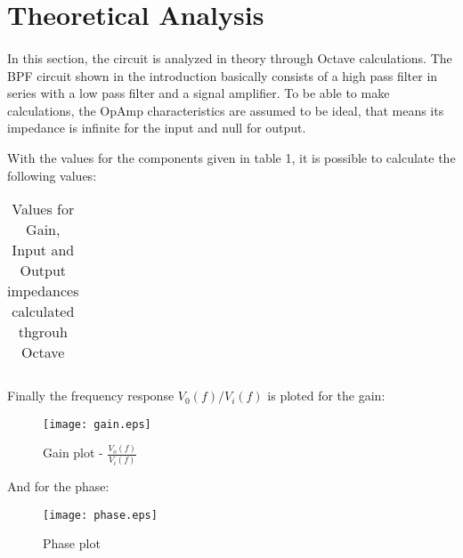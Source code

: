 \section{Theoretical Analysis}
\label{sec:analysis}
\paragraph{}

\par In this section, the circuit is analyzed in theory through Octave calculations. The BPF circuit shown in the introduction basically consists of a high pass filter in series with a low pass filter and a signal amplifier. To be able to make calculations, the OpAmp characteristics are assumed to be ideal, that means its impedance is infinite for the input and null for output.
\par With the values for the components given in table 1, it is possible to calculate the following values:

\begin{table}[H]
    \centering
    \begin{tabular}{|c|c|}
    \hline
        
    \end{tabular}
    \caption{Values for Gain, Input and Output impedances calculated thgrouh Octave}
    \label{TA}
\end{table}

\par Finally the frequency response $V_0(f)/V_i(f)$ is ploted for the gain:

\begin{figure}[H]
	\texttt{[image: gain.eps]}
	\centering
	\caption{Gain plot - $\frac{V_o(f)}{V_i(f)}$}
	\label{gain}
\end{figure}

\par And for the phase:

\begin{figure}[H]
	\texttt{[image: phase.eps]}
	\centering
	\caption{Phase plot}
	\label{pha}
\end{figure}
